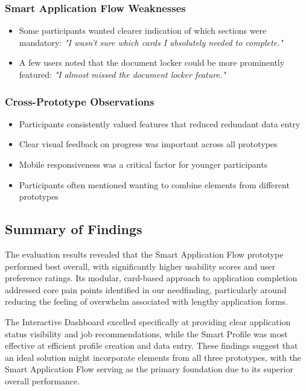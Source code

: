 \documentclass[
	letterpaper, %
]{jdf}
\begin{document}
\subsubsection{Smart Application Flow Weaknesses}
\begin{itemize}
    \item Some participants wanted clearer indication of which sections were mandatory: \textit{"I wasn't sure which cards I absolutely needed to complete."}
    \item A few users noted that the document locker could be more prominently featured: \textit{"I almost missed the document locker feature."}
\end{itemize}

\subsubsection{Cross-Prototype Observations}
\begin{itemize}
    \item Participants consistently valued features that reduced redundant data entry
    \item Clear visual feedback on progress was important across all prototypes
    \item Mobile responsiveness was a critical factor for younger participants
    \item Participants often mentioned wanting to combine elements from different prototypes
\end{itemize}

\subsection{Summary of Findings}

The evaluation results revealed that the Smart Application Flow prototype performed best overall, with significantly higher usability scores and user preference ratings. Its modular, card-based approach to application completion addressed core pain points identified in our needfinding, particularly around reducing the feeling of overwhelm associated with lengthy application forms.

The Interactive Dashboard excelled specifically at providing clear application status visibility and job recommendations, while the Smart Profile was most effective at efficient profile creation and data entry. These findings suggest that an ideal solution might incorporate elements from all three prototypes, with the Smart Application Flow serving as the primary foundation due to its superior overall performance.
\end{document}

